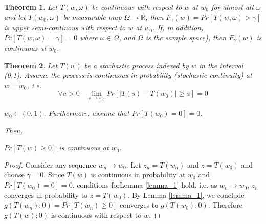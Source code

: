 \documentclass[12pt]{article} %
\newtheorem{thm}{Theorem}
\begin{document}
\begin{thm}
Let $T(w,\omega)$ be continuous with respect to $w$ at $w_0$  for almost all $\omega$ and let $T(w_0,\omega)$ be measurable map $\Omega \rightarrow \mathbb{R}$, then $F_{\gamma}(w)=Pr\left[T(w,\omega)>\gamma \right]$ is upper semi-continous with respect to $w$ at $w_0$. If, in addition, 
$Pr\left[T(w,\omega)=\gamma \right]=0$  where $\omega \in \Omega$, and $\Omega$ is the sample space), then $F_{\gamma}(w)$ is continuous at $w_0$.

\end{thm}


\begin{thm} \label{main_thm}
Let $T(w)$ be  a stochastic process indexed by $w$ in the interval (0,1). Assume  the process is continuous in probability  (stochastic continuity)   at $w=w_0$,  i.e.
\begin{equation} \forall a>0 \quad  \lim_{s \rightarrow w_0} Pr\left[\left|T(s)-T(w_0) \right| \geq a \right] = 0 
\end{equation}

 $ w_0\in (0,1)$. Furthermore, assume that $Pr\left[T(w_0)=0\right]=0$.

Then,

$Pr \left[ T(w) \geq 0\right]$ is continuous at $w_0$.
\end{thm}

\begin{proof}
Consider any sequence $w_n \rightarrow w_0$. Let $z_n = T(w_n)$ and  $z=T(w_0)$ and choose $\gamma=0$. Since $T(w)$ is continuous in probability at $w_0$ and $Pr\left[T(w_0)=0\right]=0$, conditions forLemma \ref{lemma_1} hold, i.e. as $w_n\rightarrow w_0$, $z_n$ converges in probability to $z=T(w_0)$. By  Lemma \ref{lemma_1}, we conclude  $g(T(w_n); 0 ) = Pr \left[ T(w_n) \geq 0\right]$ converges to $g(T(w_0);0)$. Therefore $g(T(w);0)$ is continuous with respect to $w$.
\end{proof}
\end{document}
